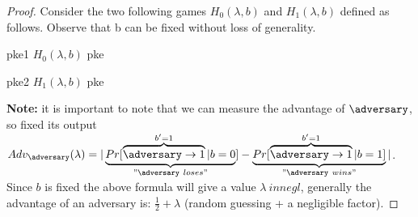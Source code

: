 \begin{proof}
    Consider the two following games $H_0(\lambda,b)$ and $H_1(\lambda, b)$ defined as follows. Observe that b can be fixed without loss of generality.
    
    \begin{cryptogame}
        {pke1}
        {$H_0(\lambda, b)$}
        {pke}


        \cseqdelay
        \cseqdelay
        \cseqdelay


    \end{cryptogame}

    \begin{cryptogame}
        {pke2}
        {$H_1(\lambda, b)$}
        {pke}


        \cseqdelay
        \cseqdelay
        \cseqdelay


    \end{cryptogame}
    

    \textbf{Note:} it is important to note that we can measure the advantage of $\adversary$, so fixed its output $Adv_{\adversary}(\lambda) = |\underbrace{Pr[\overbrace{\adversary\rightarrow 1}^{b'=1}|b=0}_{"\adversary\ loses"}]-\underbrace{Pr[\overbrace{\adversary\rightarrow 1}^{b'=1}|b=1]}_{"\adversary\ wins"}|$. Since $b$ is fixed the above formula will give a value $\lambda \ in negl$, generally the advantage of an adversary is: $\frac{1}{2}+\lambda$ (random guessing + a negligible factor). %


\end{proof}
